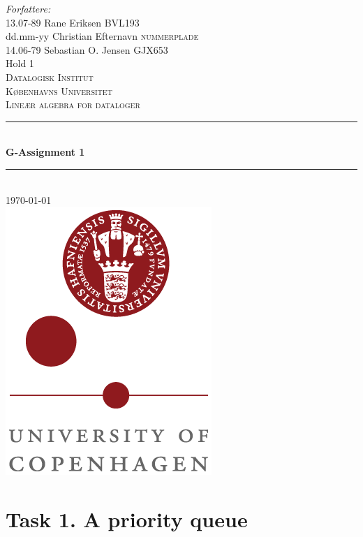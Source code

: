 \documentclass[a4paper,12pt,danish]{report}
\begin{document}
\begin{titlepage}

\newcommand{\HRule}{\rule{\linewidth}{0.4mm}}
\center
\small{ \emph{Forfattere:}\\
13.07-89 Rane Eriksen \textsc{BVL193}
\\
dd.mm-yy Christian Efternavn \textsc{nummerplade}
\\
14.06-79 Sebastian O. Jensen \textsc{GJX653}
\\
Hold 1} \\[2cm]

\textsc{\LARGE Datalogisk Institut}\\[0.5cm]
\textsc{\large Københavns Universitet}\\[1.5cm]
\textsc{\large Lineær algebra for dataloger}\\
\HRule \\[0.7cm]
{\huge \bfseries G-Assignment 1}\\[0.4cm]
\HRule \\[1.5cm]
\textsc{\Large \textsc{\today}}\\[0.5cm]

\includegraphics[scale=0.5]{ku_logo.png}\\[1cm]

\end{titlepage}
\tableofcontents
\newpage
\renewcommand{\thesection}{\arabic{section}}
\renewcommand{\thempfootnote}{\arabic{mpfootnote}}
\renewcommand\thesubsection{}
\newcommand{\minus}[1]{{#1}^{-}}
\section{Task 1. A priority queue}
\end{document}
